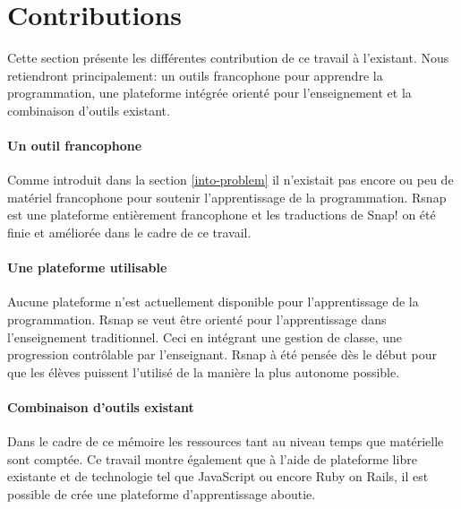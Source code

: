 \section{Contributions}
\label{intro-contribution}
Cette section présente les différentes contribution de ce travail à l'existant. Nous retiendront principalement: un outils francophone pour apprendre la programmation, une plateforme intégrée orienté pour l'enseignement et la combinaison d'outils existant.

\paragraph{Un outil francophone} Comme introduit dans la section \ref{into-problem} il n'existait pas encore ou peu de matériel francophone pour soutenir l'apprentissage de la programmation. Rsnap est une plateforme entièrement francophone et les traductions de Snap! on été finie et améliorée dans le cadre de ce travail.

\paragraph{Une plateforme utilisable} Aucune plateforme n'est actuellement disponible pour l'apprentissage de la programmation. Rsnap se veut être orienté pour l'apprentissage dans l'enseignement traditionnel. Ceci en intégrant une gestion de classe, une progression contrôlable par l'enseignant. Rsnap à été pensée dès le début pour que les élèves puissent l'utilisé de la manière la plus autonome possible.

\paragraph{Combinaison d'outils existant} Dans le cadre de ce mémoire les ressources tant au niveau temps que matérielle sont comptée. Ce travail montre également que à l'aide de plateforme libre existante et de technologie tel que JavaScript ou encore Ruby on Rails, il est possible de crée une plateforme d'apprentissage aboutie.




%
%
%
%
%
%
%
%
%
